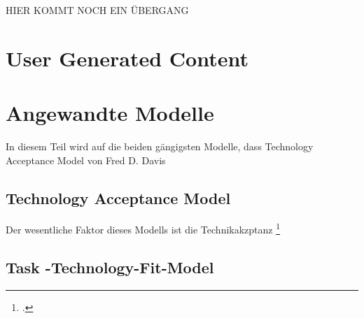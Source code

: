 HIER KOMMT NOCH EIN ÜBERGANG


\section{User Generated Content}
\label{ch:ugc}













\section{Angewandte Modelle}
\label{ch:Modelle}

In diesem Teil wird auf die beiden gängigsten Modelle, dass Technology Acceptance Model von Fred D. Davis 

\subsection{Technology Acceptance Model}
\label{TAM}

Der wesentliche Faktor dieses Modells ist die Technikakzptanz \footcite[S. 319]{Davis}

\subsection{Task -Technology-Fit-Model}
\label{ch:TTF}





